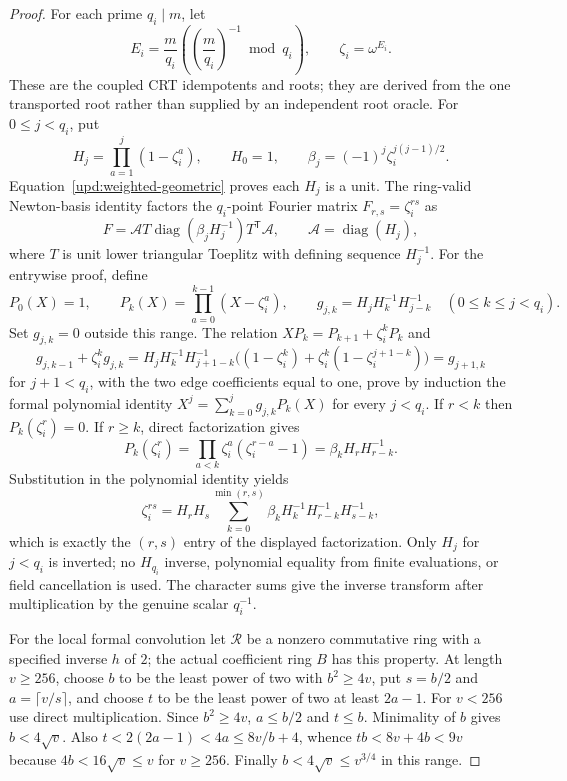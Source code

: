 \begin{proof}
For each prime $q_i\mid m$, let
\[
  E_i=\frac{m}{q_i}
       \left(\left(\frac{m}{q_i}\right)^{-1}\bmod q_i\right),
  \qquad \zeta_i=\omega^{E_i}.
\]
These are the coupled CRT idempotents and roots; they are derived from the
one transported root rather than supplied by an independent root oracle.
For $0\leq j<q_i$, put
\[
  H_j=\prod_{a=1}^j(1-\zeta_i^a),\qquad H_0=1,
  \qquad \beta_j=(-1)^j\zeta_i^{j(j-1)/2}.
\]
Equation~\eqref{upd:weighted-geometric} proves each $H_j$ is a unit.  The
ring-valid Newton-basis identity factors the $q_i$-point Fourier matrix
$F_{r,s}=\zeta_i^{rs}$ as
\[
  F=\mathcal A T\operatorname{diag}(\beta_jH_j^{-1})T^{\mathsf T}\mathcal A,
  \qquad \mathcal A=\operatorname{diag}(H_j),
\]
where $T$ is unit lower triangular Toeplitz with defining sequence
$H_j^{-1}$.  For the entrywise proof, define
\[
  P_0(X)=1,\qquad P_k(X)=\prod_{a=0}^{k-1}(X-\zeta_i^a),\qquad
  g_{j,k}=H_jH_k^{-1}H_{j-k}^{-1}\quad(0\leq k\leq j<q_i).
\]
Set $g_{j,k}=0$ outside this range.  The relation
$XP_k=P_{k+1}+\zeta_i^kP_k$ and
\[
  g_{j,k-1}+\zeta_i^kg_{j,k}
    =H_jH_k^{-1}H_{j+1-k}^{-1}
       \bigl((1-\zeta_i^k)+
                  \zeta_i^k(1-\zeta_i^{j+1-k})\bigr)
    =g_{j+1,k}
\]
for $j+1<q_i$, with the two edge coefficients equal to one, prove by
induction the formal polynomial identity
$X^j=\sum_{k=0}^j g_{j,k}P_k(X)$ for every $j<q_i$.  If $r<k$ then
$P_k(\zeta_i^r)=0$.  If $r\geq k$, direct factorization gives
\[
  P_k(\zeta_i^r)
    =\prod_{a<k}\zeta_i^a(\zeta_i^{r-a}-1)
    =\beta_k H_rH_{r-k}^{-1}.
\]
Substitution in the polynomial identity yields
\[
  \zeta_i^{rs}
    =H_rH_s\sum_{k=0}^{\min(r,s)}
       \beta_k H_k^{-1}H_{r-k}^{-1}H_{s-k}^{-1},
\]
which is exactly the $(r,s)$ entry of the displayed factorization.
Only $H_j$ for $j<q_i$ is inverted; no $H_{q_i}$ inverse, polynomial
equality from finite evaluations, or field cancellation is used.  The
character sums give the inverse transform after multiplication by the
genuine scalar $q_i^{-1}$.

For the local formal convolution let $\mathcal R$ be a nonzero commutative
ring with a specified inverse $h$ of $2$; the actual coefficient ring
$B$ has this property.  At length $v\geq256$, choose $b$ to be the least power of
two with $b^2\geq4v$, put $s=b/2$ and $a=\lceil v/s\rceil$, and choose
$t$ to be the least power of two at least $2a-1$.  For $v<256$ use direct
multiplication.  Since $b^2\geq4v$, $a\leq b/2$ and $t\leq b$.
Minimality of $b$ gives $b<4\sqrt v$.  Also
$t<2(2a-1)<4a\leq8v/b+4$, whence $tb<8v+4b<9v$ because
$4b<16\sqrt v\leq v$ for $v\geq256$.
Finally $b<4\sqrt v\leq v^{3/4}$ in this range.


\end{proof}
